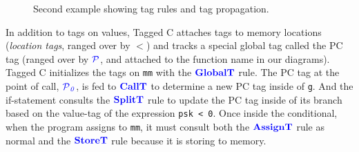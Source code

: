 \documentclass{llncs}
\begin{document}
\begin{figure}[t]
\caption{Second example showing tag rules and tag propagation.}
\label{fig:ex2}
\end{figure}

In addition to tags on values, Tagged C attaches tags to memory locations ({\em location tags}, ranged over by
\(\lt\)) and tracks a special global tag called the PC tag (ranged over by \(\PCT\), and attached to the
function name in our diagrams).
Tagged C initializes the tags on {\tt mm} with the \(\globaltname\) rule. The PC tag
at the point of call, \(\PCT[_0]\), is fed to \(\calltname\) to determine a new PC tag
inside of {\tt g}. And the if-statement consults the \(\splittname\) rule to update the PC tag
inside of its branch based on the value-tag of the expression {\tt psk < 0}. Once inside the
conditional, when the program assigns to {\tt mm}, it must consult both the
\(\assigntname\) rule as normal and the \(\storetname\) rule because it is storing
to memory.
\end{document}

